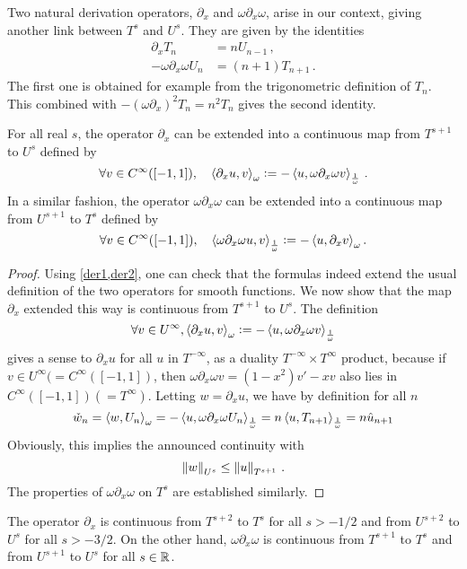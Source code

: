\documentclass[a4paper]{article}
\begin{document}
Two natural derivation operators, $\partial_x$ and $\omega \partial_x \omega$, arise in our context, giving another link between $T^s$ and $U^s$. They are given by the identities 
\begin{align}
	\partial_x T_n &= n U_{n-1}\,, \label{der1} \\
	-\omega \partial_x \omega U_n &= (n+1)T_{n+1}\,. \label{der2}
\end{align}
The first one is obtained for example from the trigonometric definition of $T_n$. This combined with $-(\omega \partial_x)^2 T_n = n^2 T_n$ gives the second identity. 
\begin{Lem}
	\label{derivations}
	For all real $s$, the operator $\partial_x$ can be extended into a continuous map from $T^{s+1}$ to $U^{s}$ defined by 
	\[\forall v \in C^{\infty}([-1,1]), \quad \left\langle \partial_x u,v\right\rangle_{\omega} \mathrel{\mathop:}= -\left\langle u,\omega \partial_x \omega v\right\rangle_{\frac{1}{\omega}} \,.\] 
	In a similar fashion, the  operator $\omega \partial_x \omega$ can be extended into a continuous map from $U^{s+1}$ to $T^{s}$ defined by
	\[\forall v \in C^{\infty}([-1,1]), \quad \left\langle \omega \partial_x \omega u,v\right\rangle_\frac{1}{\omega} \mathrel{\mathop:}= -\left\langle u,\partial_x v\right\rangle_\omega.\]
\end{Lem}
\begin{proof}
	Using \cref{der1,der2}, one can check that the formulas indeed extend the usual definition of the two operators for smooth functions. We now show that the map $\partial_x$ extended this way is continuous from $T^{s+1}$ to $U^s$. The definition 
	\[\forall v \in U^{\infty}, \left\langle \partial_x u,v\right\rangle_\omega \mathrel{\mathop:}= -\left\langle u,\omega \partial_x \omega v\right\rangle_\frac{1}{\omega}\]
	gives a sense to $\partial_x u$ for all $u$ in $T^{-\infty}$, as a duality $T^{-\infty} \times T^{\infty}$ product, because if $v \in U^{\infty} (= C^{\infty}([-1,1])$, then $\omega \partial_x \omega v = (1-x^2)v' - xv$ also lies in $C^{\infty}([-1,1]) (= T^\infty)$. Letting $w = \partial_x u$, we have by definition for all $n$
	\[\check{w}_n = \left\langle w,U_n\right\rangle_{\omega} = - \left\langle u,\omega \partial_x \omega U_n\right\rangle_\frac{1}{\omega} = n \left\langle u,T_{n+1}\right\rangle_\frac{1}{\omega} = n\hat{u}_{n+1}\]
	Obviously, this implies the announced continuity with
	\[ \left\|w\right\|_{U^s} \leq \left\|u\right\|_{T^{s+1}}\,.\]
	The properties of $\omega \partial_x \omega$ on $T^s$ are established similarly. 
\end{proof}
\begin{Cor}
	\label{corDxT2T0}
	The operator $\partial_x$ is continuous from $T^{s+2}$ to $T^s$ for all $s > -1/2 $ and from $U^{s+2}$ to $U^s$ for all $s > - 3/2$. On the other hand, $\omega \partial_x \omega$ is continuous from $T^{s+1}$ to $T^s$ and from $U^{s+1}$ to $U^s$ for all $s \in \mathbb{R}$. 
\end{Cor}
\end{document}
